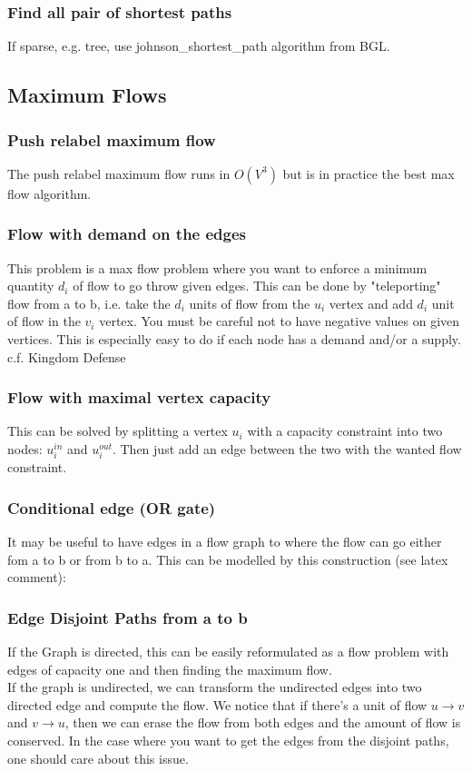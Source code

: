 \documentclass{article}
\begin{document}
\subsubsection{Find all pair of shortest paths}
If sparse, e.g. tree, use johnson\_shortest\_path algorithm from BGL.

\subsection{Maximum Flows}
\subsubsection{Push relabel maximum flow}
The push relabel maximum flow runs in $O(V^3)$ but is in practice the best max flow algorithm.

\subsubsection{Flow with demand on the edges}
This problem is a max flow problem where you want to enforce a minimum quantity $d_i$ of flow to go throw given edges. This can be done by "teleporting" flow from a to b, i.e. take the $d_i$ units of flow from the $u_i$ vertex and add $d_i$ unit of flow in the $v_i$ vertex. You must be careful not to have negative values on given vertices. This is especially easy to do if each node has a demand and/or a supply. \\
c.f. Kingdom Defense

\subsubsection{Flow with maximal vertex capacity}
This can be solved by splitting a vertex $u_i$ with a capacity constraint into two nodes: $u_i^{in}$ and $u_i^{out}$. Then just add an edge between the two with the wanted flow constraint.

\subsubsection{Conditional edge (OR gate)}
It may be useful to have edges in a flow graph to where the flow can go either fom a to b or from b to a. This can be modelled by this construction (see latex comment):
%

\subsubsection{Edge Disjoint Paths from a to b}
If the Graph is directed, this can be easily reformulated as a flow problem with edges of capacity one and then finding the maximum flow. \\
If the graph is undirected, we can transform the undirected edges into two directed edge and compute the flow. We notice that if there's a unit of flow $u \rightarrow v$ and $v \rightarrow u$, then we can erase the flow from both edges and the amount of flow is conserved. In the case where you want to get the edges from the disjoint paths, one should care about this issue. 
\end{document}
